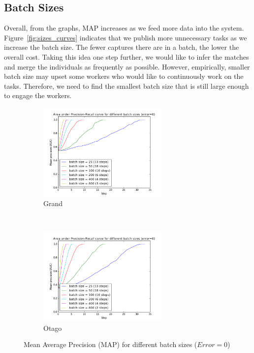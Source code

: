 \subsection{Batch Sizes} %
\label{sub:batch_sizes_res}

Overall, from the graphs, MAP increases as we feed more data into the system.
Figure~\ref{fig:sizes_curves} indicates that we publish more unnecessary
tasks as we increase the batch size. The fewer captures there are in a batch,
the lower the overall cost. Taking this idea one step further, we would like to
infer the matches and merge the individuals as frequently as possible. However,
empirically, smaller batch size may upset some workers who would like to
continuously work on the tasks. Therefore, we need to find the smallest batch
size that is still large enough to engage the workers.

\begin{figure}[htbp]
  \centering
  \begin{subfigure}[t]{\textwidth}
      \centering
      \includegraphics[width=0.7\textwidth]{sizes/graoc}
      \caption{Grand}
  \end{subfigure}%
  ~ \\
    \begin{subfigure}[t]{\textwidth}
      \centering
      \includegraphics[width=0.7\textwidth]{sizes/otaoc}
      \caption{Otago}
  \end{subfigure}%
  \captionsetup{justification=centering}
  \caption{Mean Average Precision (MAP) for different batch sizes ($Error=0$)}
\end{figure}

